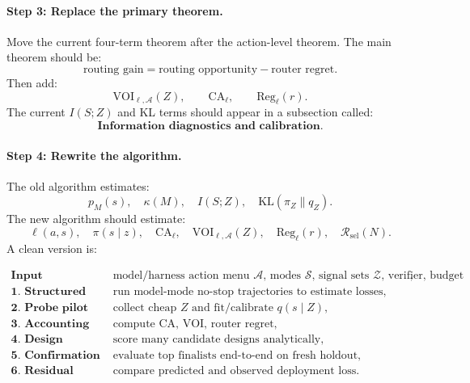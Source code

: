 \documentclass{article}
\providecommand{\KL}{\mathrm{KL}}
\begin{document}
\paragraph{Step 3: Replace the primary theorem.}
Move the current four-term theorem after the action-level theorem.
The main theorem should be:
\[
    \text{routing gain}=\text{routing opportunity}-\text{router regret}.
\]
Then add:
\[
    \mathrm{VOI}_{\ell,\mathcal A}(Z),
    \qquad
    \mathrm{CA}_\ell,
    \qquad
    \mathrm{Reg}_\ell(r).
\]
The current \(I(S;Z)\) and KL terms should appear in a subsection called:
\[
    \textbf{Information diagnostics and calibration.}
\]

\paragraph{Step 4: Rewrite the algorithm.}
The old algorithm estimates:
\[
    p_M(s),\quad \kappa(M),\quad I(S;Z),\quad \KL(\pi_Z\|q_Z).
\]
The new algorithm should estimate:
\[
    \ell(a,s),\quad
    \pi(s\mid z),\quad
    \mathrm{CA}_\ell,\quad
    \mathrm{VOI}_{\ell,\mathcal A}(Z),\quad
    \mathrm{Reg}_\ell(r),\quad
    \mathcal R_{\mathrm{sel}}(N).
\]
A clean version is:

\[
\begin{array}{ll}
    \textbf{Input} &
    \text{model/harness action menu \(\mathcal A\), modes \(\mathcal S\),
    signal sets \(\mathcal Z\), verifier, budget},\\
    \textbf{1. Structured pilot} &
    \text{run model-mode no-stop trajectories to estimate losses},\\
    \textbf{2. Probe pilot} &
    \text{collect cheap \(Z\) and fit/calibrate \(q(s\mid Z)\)},\\
    \textbf{3. Accounting} &
    \text{compute \(\mathrm{CA}\), \(\mathrm{VOI}\), router regret},\\
    \textbf{4. Design scoring} &
    \text{score many candidate designs analytically},\\
    \textbf{5. Confirmation} &
    \text{evaluate top finalists end-to-end on fresh holdout},\\
    \textbf{6. Residual audit} &
    \text{compare predicted and observed deployment loss}.
\end{array}
\]
\end{document}
